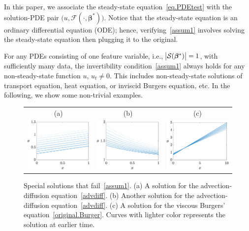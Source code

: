 \documentclass[a4paper,11pt]{article}
\newcommand{\bbeta}{\bm{\beta}}
\newcommand{\mS}{\mathcal{S}}
\theoremstyle{definition}
\begin{document}
In this paper, we associate  the steady-state equation~\eqref{eq.PDEtest}  with the solution-PDE pair $\big(u,\mathcal{F}(\cdot,\bbeta^*)\big)$. Notice that the steady-state equation   is an ordinary differential equation (ODE); hence, verifying~\eqref{assum1} involves solving  the steady-state equation then plugging it to the original.

For any PDEs consisting of one feature variable, i.e., $\abs{\mS(\bbeta^*)}=1$, with sufficiently many data, the invertibility condition~\eqref{assum1} always holds for any non-steady-state  function $u$, $u_t\neq 0$. This includes non-steady-state  solutions of transport equation, heat equation, or inviscid Burgers equation, etc. In the following, we show some non-trivial examples.
\begin{figure}
\centering
\begin{tabular}{ccc}
(a)&(b)&(c)\\
\includegraphics[width=2in]{Figures/advdiffExp2.eps}&
\includegraphics[width=2in]{Figures/advdiffexp1.eps}&
\includegraphics[width=2in]{Figures/vBurgersExp1.eps}
\end{tabular}
\caption{Special solutions that fail~\eqref{assum1}. (a) A solution for the advection-diffusion equation~\eqref{advdiff}. (b) Another solution for the advection-diffusion equation~\eqref{advdiff}. (c) A solution for the viscous Burgers' equation~\eqref{original.Burger}. Curves with lighter color represents the solution at earlier time.}\label{fig.invertibility}	
\end{figure}
\end{document}
